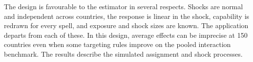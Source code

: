 The design is favourable to the estimator in several respects. Shocks are normal and independent
across countries, the response is linear in the shock, capability is redrawn for every spell, and
exposure and shock sizes are known. The application departs from each of these. In this design, average effects can be imprecise at 150 countries even when some
targeting rules improve on the pooled interaction benchmark. The results describe the
simulated assignment and shock processes.
